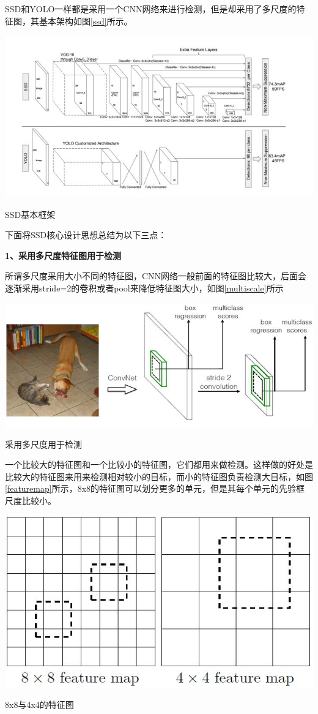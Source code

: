 SSD和YOLO一样都是采用一个CNN网络来进行检测，但是却采用了多尺度的特征图，其基本架构如图\ref{ssd}所示。
\begin{uscfigure}
	\includegraphics[width=\textwidth]{./Pictures/ssd_modual.jpg}	
	\caption{SSD基本框架}
	\label{ssd}
\end{uscfigure}


下面将SSD核心设计思想总结为以下三点：

\textbf{1、采用多尺度特征图用于检测 }

所谓多尺度采用大小不同的特征图，CNN网络一般前面的特征图比较大，后面会逐渐采用stride=2的卷积或者pool来降低特征图大小，如图\ref{multiscale}所示
\begin{uscfigure}
	\includegraphics[width=\textwidth]{./Pictures/ssd_(1).jpg}	
	\caption{采用多尺度用于检测}
	\label{multiscale}
\end{uscfigure}
一个比较大的特征图和一个比较小的特征图，它们都用来做检测。这样做的好处是比较大的特征图来用来检测相对较小的目标，而小的特征图负责检测大目标，如图\ref{featuremap}所示，8x8的特征图可以划分更多的单元，但是其每个单元的先验框尺度比较小。
\begin{uscfigure}
	\includegraphics[width=\textwidth]{./Pictures/ssd_(2).jpg}	
	\caption{8x8与4x4的特征图}
	\label{featuremap}
\end{uscfigure}

